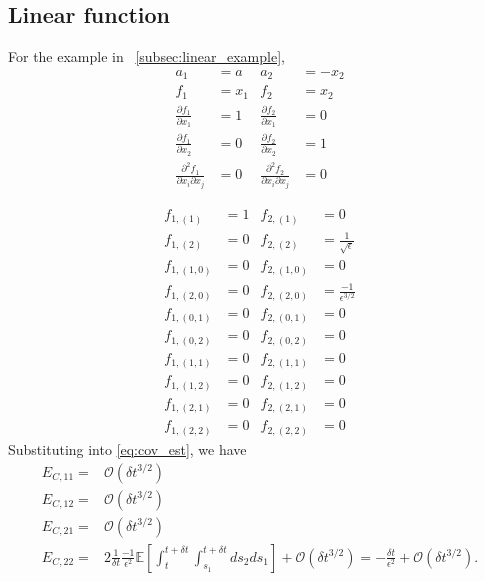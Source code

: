 \subsection{Linear function}

For the example in \sec~\ref{subsec:linear_example}, 
\begin{equation}
\begin{aligned}
a_1 &= a 
&
a_2 &= -x_2
\\
f_1 &= x_1 
&
f_2 &= x_2 
\\
\frac{\partial f_1}{\partial x_1} &= 1
&
\frac{\partial f_2}{\partial x_1} &= 0 
\\
\frac{\partial f_1}{\partial x_2} &= 0
&
\frac{\partial f_2}{\partial x_2} &= 1 
\\
\frac{\partial^2 f_1}{\partial x_i \partial x_j} &= 0
&
\frac{\partial^2 f_2}{\partial x_i \partial x_j} &= 0
\end{aligned}
\end{equation}

\begin{equation}
\begin{aligned}
f_{1,(1)} &= 1
&
f_{2,(1)} &= 0
\\
f_{1,(2)} &= 0
&
f_{2,(2)} &= \frac{1}{\sqrt{\epsilon}}
\\
f_{1,(1,0)} &= 0
&
f_{2,(1,0)} &= 0
\\
f_{1,(2,0)} &= 0
&
f_{2,(2,0)} &= \frac{-1}{\epsilon^{3/2}} 
\\
f_{1,(0,1)} &= 0
&
f_{2,(0,1)} &= 0
\\
f_{1,(0,2)} &= 0
&
f_{2,(0,2)} &= 0
\\
f_{1,(1,1)} &= 0
&
f_{2,(1,1)} &= 0
\\
f_{1,(1,2)} &= 0
&
f_{2,(1,2)} &= 0
\\
f_{1,(2,1)} &= 0
&
f_{2,(2,1)} &= 0
\\
f_{1,(2,2)} &= 0
&
f_{2,(2,2)} &= 0
\end{aligned}
\end{equation}
%
Substituting into \eqref{eq:cov_est}, we have
\begin{equation}
\begin{aligned}
E_{C, 11} =& \mathcal{O} (\delta t^{3/2}) \\
E_{C,12} =& \mathcal{O} (\delta t^{3/2}) \\
E_{C,21} =& \mathcal{O} (\delta t^{3/2}) \\
E_{C,22} =&
2 \frac{1}{\delta t}\frac{-1}{\epsilon^2} \mathbb{E} \left[ \int_t^{t+\delta t} \int_{s_1}^{t+\delta t} ds_2 ds_1 \right] + \mathcal{O} (\delta t^{3/2})
= - \frac{\delta t}{\epsilon^2} + \mathcal{O} (\delta t^{3/2}) .
\end{aligned}
\end{equation}

